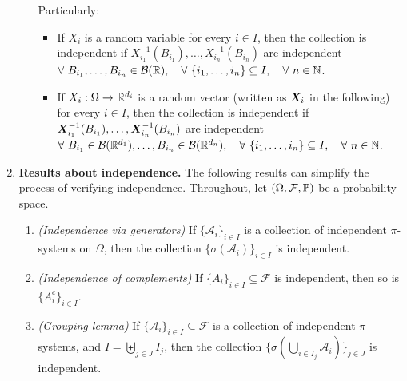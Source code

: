 \begin{enumerate}
\begin{enumerate}
Particularly:
\begin{itemize}
\item If \(X_i\) is a random variable for every \(i\in I\), then the collection
is independent if \(X_{i_1}^{-1}(B_{i_1}),\dotsc,X_{i_n}^{-1}(B_{i_n})\) are
independent
\(\forall~B_{i_1},\dotsc,B_{i_n}\in\mathcal{B}(\mathbb{R}),\quad
\forall~\{i_{1},\dotsc,i_{n}\}\subseteq I,\quad
\forall~n\in\mathbb{N}\).
\item If \(X_i:\Omega\to\mathbb{R}^{d_i}\) is a random vector (written as \(\bm{X}_i\) in the
following) for every \(i\in I\), then the collection is independent if
\(\bm{X}_{i_1}^{-1}(B_{i_1}),\dotsc,\bm{X}_{i_n}^{-1}(B_{i_n})\) are independent
\(\forall~B_{i_1}\in\mathcal{B}(\mathbb{R}^{d_1}),\dotsc,B_{i_n}\in\mathcal{B}(\mathbb{R}^{d_n}),\quad
\forall~\{i_{1},\dotsc,i_{n}\}\subseteq I,\quad
\forall~n\in\mathbb{N}\).
\end{itemize}
\end{enumerate}
\item \textbf{Results about independence.} The following results can simplify
the process of verifying independence. Throughout, let
\((\Omega,\mathcal{F},\mathbb{P})\) be a probability space.
\begin{enumerate}
\item \label{it:ind-via-gen} \emph{(Independence via generators)} If
\(\{\mathcal{A}_{i}\}_{i\in I}\) is a collection of independent \(\pi\)-systems
on \(\Omega\), then the collection \(\{\sigma(\mathcal{A}_i)\}_{i\in I}\) is
independent.
\item \label{it:ind-comp} \emph{(Independence of complements)} If \(\{A_{i}\}_{i\in I}\subseteq \mathcal{F}\)
is independent, then so is \(\{A_{i}^c\}_{i\in I}\).
\item \label{it:grouping-lma} \emph{(Grouping lemma)} If \(\{\mathcal{A}_{i}\}_{i\in
I}\subseteq \mathcal{F}\) is a collection of independent \(\pi\)-systems, and
\(I=\biguplus_{j\in J}^{}I_j\), then the collection \(\{\sigma(\bigcup_{i\in
I_j}^{}\mathcal{A}_i)\}_{j\in J}\) is independent.
\begin{center}
\end{center}
\end{enumerate}
\end{enumerate}
